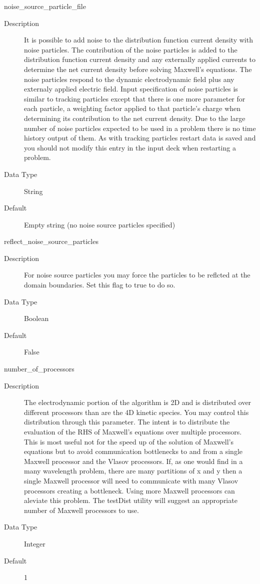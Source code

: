 \documentclass[11pt]{amsart}
\begin{document}
noise\_source\_particle\_file
\begin{description}
\item [Description] It is possible to add noise to the distribution function
current density with noise particles.  The contribution of the noise particles
is added to the distribution function current density  and any externally
applied currents to determine the net current density before solving Maxwell's
equations.  The noise particles respond to the dynamic electrodynamic field plus
any externaly applied electric field.  Input specification of noise particles is
similar to tracking particles except that there is one more parameter for each
particle, a weighting factor applied to that particle's charge when determining
its contribution to the net current density.  Due to the large number of noise
particles expected to be used in a problem there is no time history output of
them.  As with tracking particles restart data is saved and you should not
modify this entry in the input deck when restarting a problem.
\item [Data Type] String
\item [Default] Empty string (no noise source particles specified)
\end{description}

reflect\_noise\_source\_particles
\begin{description}
\item [Description] For noise source particles you may force the particles to
be reflcted at the domain boundaries.  Set this flag to true to do so.
\item [Data Type] Boolean
\item [Default] False
\end{description}

number\_of\_processors
\begin{description}
\item [Description] The electrodynamic portion of the algorithm is 2D and is
distributed over different processors than are the 4D kinetic species.  You
may control this distribution through this parameter.  The intent is to
distribute the evaluation of the RHS of Maxwell's equations over multiple
processors.  This is most useful not for the speed up of the solution of
Maxwell's equations but to avoid communication bottlenecks to and from a single
Maxwell processor and the Vlasov processors.  If, as one would find in a many
wavelength problem, there are many partitions of x and y then a single Maxwell
processor will need to communicate with many Vlasov processors creating a
bottleneck.  Using more Maxwell processors can aleviate this problem.  The
testDist utility will suggest an appropriate number of Maxwell processors to
use.
\item [Data Type] Integer
\item [Default] 1
\end{description}
\end{document}
